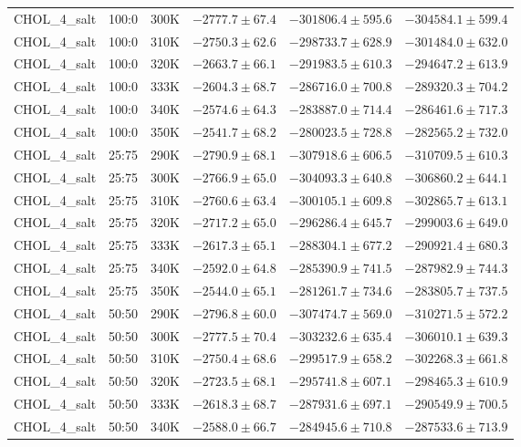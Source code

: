 \begin{longtable}{|c|c|c|c|c|c|}
CHOL\_4\_salt & 100:0 & 300K & $-2777.7 \pm 67.4$ & $-301806.4 \pm 595.6$ & $-304584.1 \pm 599.4$ \\
CHOL\_4\_salt & 100:0 & 310K & $-2750.3 \pm 62.6$ & $-298733.7 \pm 628.9$ & $-301484.0 \pm 632.0$ \\
CHOL\_4\_salt & 100:0 & 320K & $-2663.7 \pm 66.1$ & $-291983.5 \pm 610.3$ & $-294647.2 \pm 613.9$ \\
CHOL\_4\_salt & 100:0 & 333K & $-2604.3 \pm 68.7$ & $-286716.0 \pm 700.8$ & $-289320.3 \pm 704.2$ \\
CHOL\_4\_salt & 100:0 & 340K & $-2574.6 \pm 64.3$ & $-283887.0 \pm 714.4$ & $-286461.6 \pm 717.3$ \\
CHOL\_4\_salt & 100:0 & 350K & $-2541.7 \pm 68.2$ & $-280023.5 \pm 728.8$ & $-282565.2 \pm 732.0$ \\
CHOL\_4\_salt & 25:75 & 290K & $-2790.9 \pm 68.1$ & $-307918.6 \pm 606.5$ & $-310709.5 \pm 610.3$ \\
CHOL\_4\_salt & 25:75 & 300K & $-2766.9 \pm 65.0$ & $-304093.3 \pm 640.8$ & $-306860.2 \pm 644.1$ \\
CHOL\_4\_salt & 25:75 & 310K & $-2760.6 \pm 63.4$ & $-300105.1 \pm 609.8$ & $-302865.7 \pm 613.1$ \\
CHOL\_4\_salt & 25:75 & 320K & $-2717.2 \pm 65.0$ & $-296286.4 \pm 645.7$ & $-299003.6 \pm 649.0$ \\
CHOL\_4\_salt & 25:75 & 333K & $-2617.3 \pm 65.1$ & $-288304.1 \pm 677.2$ & $-290921.4 \pm 680.3$ \\
CHOL\_4\_salt & 25:75 & 340K & $-2592.0 \pm 64.8$ & $-285390.9 \pm 741.5$ & $-287982.9 \pm 744.3$ \\
CHOL\_4\_salt & 25:75 & 350K & $-2544.0 \pm 65.1$ & $-281261.7 \pm 734.6$ & $-283805.7 \pm 737.5$ \\
CHOL\_4\_salt & 50:50 & 290K & $-2796.8 \pm 60.0$ & $-307474.7 \pm 569.0$ & $-310271.5 \pm 572.2$ \\
CHOL\_4\_salt & 50:50 & 300K & $-2777.5 \pm 70.4$ & $-303232.6 \pm 635.4$ & $-306010.1 \pm 639.3$ \\
CHOL\_4\_salt & 50:50 & 310K & $-2750.4 \pm 68.6$ & $-299517.9 \pm 658.2$ & $-302268.3 \pm 661.8$ \\
CHOL\_4\_salt & 50:50 & 320K & $-2723.5 \pm 68.1$ & $-295741.8 \pm 607.1$ & $-298465.3 \pm 610.9$ \\
CHOL\_4\_salt & 50:50 & 333K & $-2618.3 \pm 68.7$ & $-287931.6 \pm 697.1$ & $-290549.9 \pm 700.5$ \\
CHOL\_4\_salt & 50:50 & 340K & $-2588.0 \pm 66.7$ & $-284945.6 \pm 710.8$ & $-287533.6 \pm 713.9$ \\

\end{longtable}
